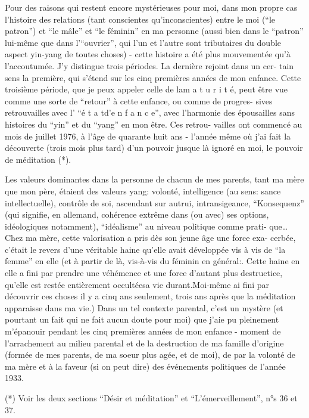 Pour des raisons qui restent encore mystérieuses pour moi, dans mon propre
cas l'histoire des relations (tant conscientes qu'inconscientes) entre le moi
(``le patron'')\inserted{,} et ``le mâle'' et ``le féminin'' en ma personne (aussi bien dans le
``patron'' lui-même que dans l'``ouvrier'', qui l'un et l'autre sont tributaires du
double aspect yin-yang de toutes choses) - cette histoire a été plus mouvementée
qu'à l'accoutumée. J'y distingue trois périodes. La dernière rejoint dans un cer-\newline
tain sens la première, qui s'étend sur les cinq premières années de mon enfance.
Cette troisième période, que je peux appeler celle de la\quad m a t u r i t é\quad,
peut être vue comme une sorte de ``retour'' à cette enfance, ou comme de progres-\newline
sives retrouvailles avec l' ``é t a t\quad d'\quad e n f a n c e'', avec l'harmonie
des épousailles sans histoires du ``yin'' et du ``yang'' en mon être. Ces retrou-\newline
vailles ont commencé au mois de juillet 1976, à l'âge de quarante huit ans -
l'année même où j'ai fait la découverte (trois mois plus tard) d'un pouvoir
jusque là ignoré en moi, le pouvoir de méditation (*).

Les valeurs dominantes dans la personne de chacun de mes parents, tant ma
mère que mon père, étaient des valeurs yang: volonté, intelligence (au sens: \newline
sance intellectuelle), contrôle de soi, ascendant sur autrui, intransigeance,
``Konsequenz'' (qui signifie, en allemand, cohérence extrême dans (ou avec) ses
options, idéologiques notamment), ``idéalisme'' au niveau politique comme prati-\newline
que\ldots Chez ma mère, cette valorisation a pris dès son jeune âge une force exa-\newline
cerbée, c'était le revers d'une véritable haine qu'elle avait développée vis à
vis de ``la femme'' en elle (et à partir de là, vis-à-vis du féminin en général:\inserted{)}.
Cette haine en elle a fini par prendre une véhémence et une force d'autant plus
destructice, qu'elle est restée entièrement occultéesa vie durant.\inserted{(}Moi-même ai
fini par découvrir ces choses il y a cinq ans seulement, trois ans après que la
méditation apparaisse dans ma vie.) Dans un tel contexte parental, c'est un
mystère (et pourtant un fait qui ne fait aucun doute pour moi) que j'aie pu
pleinement m'épanouir pendant les cinq premières années de mon enfance - 
moment de l'arrachement au milieu parental et de la destruction de ma famille
d'origine (formée de mes parents, de ma soeur plus agée, et de moi), de par la
volonté de ma mère et à la faveur (si on peut dire) des événements politiques de
l'année 1933.

(*) Voir les deux sections ``Désir et méditation'' et ``L'émerveillement'', n°s 36
et 37.
